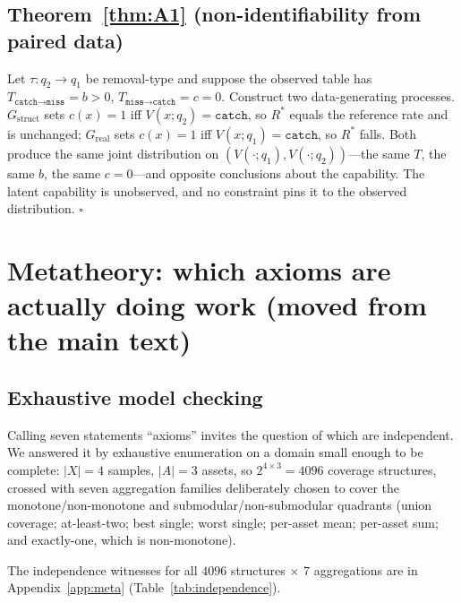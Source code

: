 \documentclass{article}
\newcommand{\Rstar}{R^{*}}
\newcommand{\catch}{\texttt{catch}}
\newcommand{\miss}{\texttt{miss}}
\begin{document}
\subsection*{Theorem~\ref{thm:A1} (non-identifiability from paired data)}

Let $\tau:q_2\to q_1$ be removal-type and suppose the observed table has
$T_{\catch\to\miss}=b>0$, $T_{\miss\to\catch}=c=0$. Construct two data-generating processes.
$G_{\text{struct}}$ sets $c(x)=1$ iff $V(x;q_2)=\catch$, so $\Rstar$ equals the reference rate and is
unchanged; $G_{\text{real}}$ sets $c(x)=1$ iff $V(x;q_1)=\catch$, so $\Rstar$ falls. Both produce the same
joint distribution on $(V(\cdot;q_1),V(\cdot;q_2))$---the same $T$, the same $b$, the same $c=0$---and
opposite conclusions about the capability. The latent capability is unobserved, and no constraint pins it to
the observed distribution. $\square$



\section{Metatheory: which axioms are actually doing work (moved from the main text)}
\label{app:metadetail}
\label{sec:meta}%

\subsection{Exhaustive model checking}
\label{sec:metadomain}

Calling seven statements ``axioms'' invites the question of which are independent. We answered it by
exhaustive enumeration on a domain small enough to be complete: $|X|=4$ samples, $|A|=3$ assets, so
$2^{4\times3}=4096$ coverage structures, crossed with seven aggregation families deliberately chosen to
cover the monotone/non-monotone and submodular/non-submodular quadrants (union coverage; at-least-two; best
single; worst single; per-asset mean; per-asset sum; and exactly-one, which is non-monotone).


The independence witnesses for all $4096$ structures $\times$ $7$ aggregations are in Appendix~\ref{app:meta} (Table~\ref{tab:independence}).
\end{document}
